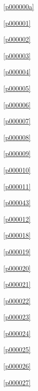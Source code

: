 ﻿



\noindent\figurename\ \ref{p000000a}\dotfill\pageref{p000000a}

\noindent\figurename\ \ref{p000001}\dotfill\pageref{p000001}

\noindent\figurename\ \ref{p000002}\dotfill\pageref{p000002}

\noindent\figurename\ \ref{p000003}\dotfill\pageref{p000003}

\noindent\figurename\ \ref{p000004}\dotfill\pageref{p000004}

\noindent\figurename\ \ref{p000005}\dotfill\pageref{p000005}

\noindent\figurename\ \ref{p000006}\dotfill\pageref{p000006}

\noindent\figurename\ \ref{p000007}\dotfill\pageref{p000007}

\noindent\figurename\ \ref{p000008}\dotfill\pageref{p000008}

\noindent\figurename\ \ref{p000009}\dotfill\pageref{p000009}

\noindent\figurename\ \ref{p000010}\dotfill\pageref{p000010}

\noindent\figurename\ \ref{p000011}\dotfill\pageref{p000011}

\noindent\figurename\ \ref{p000043}\dotfill\pageref{p000043}

\noindent\figurename\ \ref{p000012}\dotfill\pageref{p000012}

\noindent\figurename\ \ref{p000018}\dotfill\pageref{p000018}

\noindent\figurename\ \ref{p000019}\dotfill\pageref{p000019}

\noindent\figurename\ \ref{p000020}\dotfill\pageref{p000020}

\noindent\figurename\ \ref{p000021}\dotfill\pageref{p000021}

\noindent\figurename\ \ref{p000022}\dotfill\pageref{p000022}

\noindent\figurename\ \ref{p000023}\dotfill\pageref{p000023}

\noindent\figurename\ \ref{p000024}\dotfill\pageref{p000024}

\noindent\figurename\ \ref{p000025}\dotfill\pageref{p000025}

\noindent\figurename\ \ref{p000026}\dotfill\pageref{p000026}

\noindent\figurename\ \ref{p000027}\dotfill\pageref{p000027}

